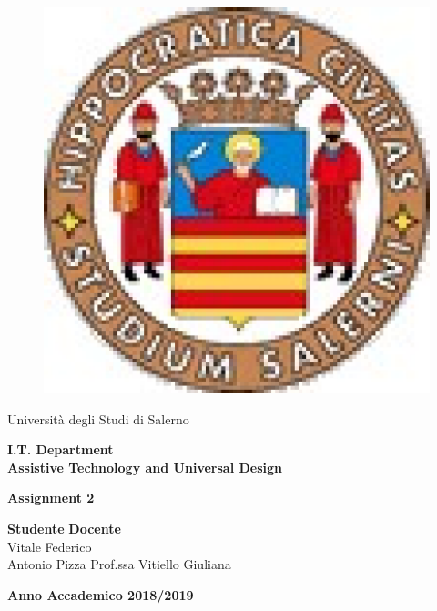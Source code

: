 \documentclass[11pt,oneside]{article}
\begin{document}
	
	\begin{titlepage}
		\begin{center}
			\hrulefill
			
			\begin{figure}[ht]\centering
				\includegraphics[width=3truecm]{Figure/logounisa.eps}
			\end{figure}
			
			
			{\Large Università degli Studi di Salerno}\\[0.2truecm]
			\hrulefill
			\vfill
		\end{center}
		
		
		
		
		\begin{center}
			
			\textbf{\Large I.T. Department}\\
			\vfill
			\textbf{\Large Assistive Technology and Universal Design}
		\end{center}
		\vfill  	
		\begin{center}
			\textbf{\Huge Assignment 2}\\[0.2truecm]
		\end{center}
		\vfill \vfill
		
		
		\vspace*{\fill}
		
		{\bf Studente } \hfill {\bf Docente}\ \ \\
		Vitale Federico \\ Antonio Pizza \hfill Prof.ssa Vitiello Giuliana\\
		
		\begin{center}
			\textbf{Anno Accademico 2018/2019}
		\end{center}
		
	\end{titlepage}
\end{document}
